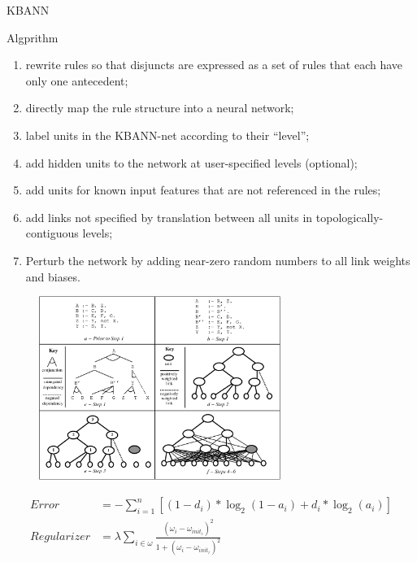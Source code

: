 \documentclass[presentation]{beamer}\mode<presentation>{\usetheme{AMSBolognaFC}}
\begin{document}
\begin{frame}[allowframebreaks]{KBANN}
    \begin{block}{Algprithm}
        \begin{enumerate}
            \item rewrite rules so that disjuncts are expressed as a set of rules that each have only one antecedent;
            \item directly map the rule structure into a neural network;
            \item label units in the KBANN-net according to their ``level'';
            \item add hidden units to the network at user-specified levels (optional);
            \item add units for known input features that are not referenced in the rules;
            \item add links not specified by translation between all units in topologically-contiguous levels;
            \item Perturb the network by adding near-zero random numbers to all link weights and biases.
        \end{enumerate}
    \end{block}

    \framebreak

    \begin{figure}
        \centering
        \includegraphics[width=0.7\textwidth]{figures/kbann-algorithm.png}
    \end{figure}

    \framebreak
    
    \begin{equation*}
        \begin{aligned}
            \textit{Error}&= - \sum_{i=1}^{n}{[(1-d_{i})*\log_{2}{(1-a_{i})} + d_{i}*\log_{2}{(a_{i})}]}\\
            \textit{Regularizer}&=\lambda\sum_{i\in\omega}{\frac{(\omega_{i} - \omega_{init_{i}})^{2}}{1+(\omega_{i}- \omega_{init_{i}})^{2}}}
        \end{aligned}
    \end{equation*}
\end{frame}
\end{document}
